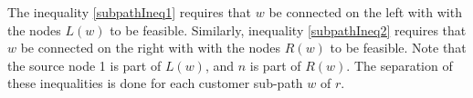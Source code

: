 \documentclass[11pt]{article}
\theoremstyle{definition}
\begin{document}
The inequality \eqref{subpathIneq1} requires that $w$ be connected on the left with with the nodes $L(w)$ to be feasible. Similarly, inequality \eqref{subpathIneq2} requires that $w$ be connected on the right with with the nodes $R(w)$ to be feasible. Note that the source node 1 is part of $L(w)$, and $n$ is part of $R(w)$. The separation of these inequalities is done for each customer sub-path $w$ of $r$.



%
%
%



%
\end{document}
